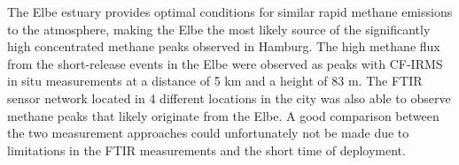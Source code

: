 The Elbe estuary provides optimal conditions for similar rapid methane emissions to the atmosphere, making the Elbe the most likely source of the significantly high concentrated methane peaks observed in Hamburg. 
The high methane flux from the short-release events in the Elbe were observed as peaks with CF-IRMS in situ measurements at a distance of 5 km and a height of 83 m. The FTIR sensor network located in 4 different locations in the city was also able to observe methane peaks that likely originate from the Elbe. A good comparison between the two measurement approaches could unfortunately not be made due to limitations in the FTIR measurements and the short time of deployment. 








